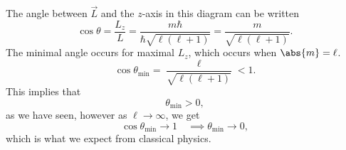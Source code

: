 \documentclass[../quantum_mechanics.tex]{subfiles}
\begin{document}
            The angle between $\vec{L}$ and the $z$-axis in this diagram can be written
            \begin{equation}
                \cos\theta=\frac{L_z}{L}=\frac{m\hbar}{\hbar\sqrt{\ell(\ell+1)}}=\frac{m}{\sqrt{\ell(\ell+1)}}.
            \end{equation}
            The minimal angle occurs for maximal $L_z$, which occurs when $\abs{m}=\ell$.
            \begin{equation}
                \cos\theta_\text{min}=\frac{\ell}{\sqrt{\ell(\ell+1)}}<1.
            \end{equation}
            This implies that
            \begin{equation}
                \theta_\text{min}>0,
            \end{equation}
            as we have seen, however as $\ell\to\infty$, we get
            \begin{equation}
                \cos\theta_\text{min}\to 1\quad\implies\theta_\text{min}\to 0,
            \end{equation}
            which is what we expect from classical physics.
\end{document}
